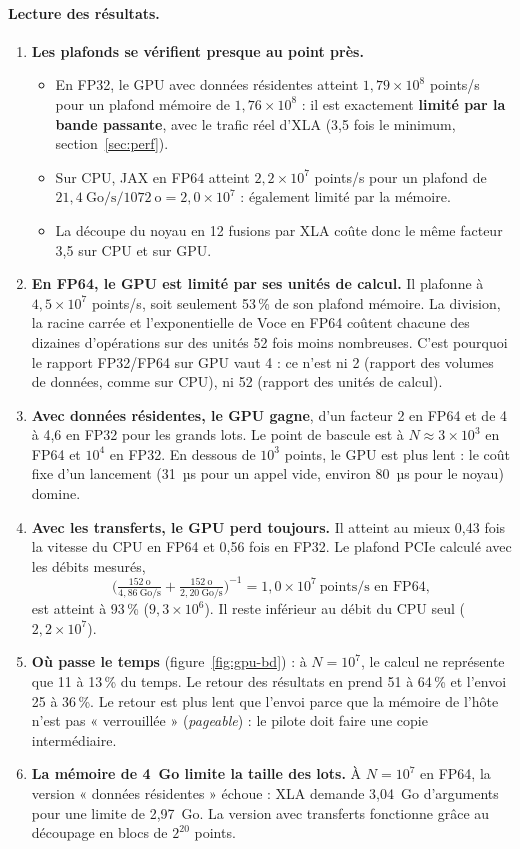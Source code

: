 \paragraph{Lecture des résultats.}
\begin{enumerate}
  \item \textbf{Les plafonds se vérifient presque au point près.}
  \begin{itemize}[nosep]
    \item En FP32, le GPU avec données résidentes atteint $1{,}79\times10^8$ points/s pour un plafond mémoire de $1{,}76\times10^8$ : il est exactement \textbf{limité par la bande passante}, avec le trafic réel d'XLA (3,5 fois le minimum, section~\ref{sec:perf}).
    \item Sur CPU, JAX en FP64 atteint $2{,}2\times10^7$ points/s pour un plafond de $21{,}4\ \text{Go/s} / 1072\ \text{o} = 2{,}0\times10^7$ : également limité par la mémoire.
    \item La découpe du noyau en 12 fusions par XLA coûte donc le même facteur 3,5 sur CPU et sur GPU.
  \end{itemize}
  \item \textbf{En FP64, le GPU est limité par ses unités de calcul.} Il plafonne à $4{,}5\times10^7$ points/s, soit seulement 53\,\% de son plafond mémoire. La division, la racine carrée et l'exponentielle de Voce en FP64 coûtent chacune des dizaines d'opérations sur des unités 52 fois moins nombreuses. C'est pourquoi le rapport FP32/FP64 sur GPU vaut 4 : ce n'est ni 2 (rapport des volumes de données, comme sur CPU), ni 52 (rapport des unités de calcul).
  \item \textbf{Avec données résidentes, le GPU gagne}, d'un facteur 2 en FP64 et de 4 à 4,6 en FP32 pour les grands lots. Le point de bascule est à $N\approx3\times10^3$ en FP64 et $10^4$ en FP32. En dessous de $10^3$ points, le GPU est plus lent : le coût fixe d'un lancement (31~µs pour un appel vide, environ 80~µs pour le noyau) domine.
  \item \textbf{Avec les transferts, le GPU perd toujours.} Il atteint au mieux 0,43 fois la vitesse du CPU en FP64 et 0,56 fois en FP32. Le plafond PCIe calculé avec les débits mesurés,
  \[
  \Big(\tfrac{152\ \text{o}}{4{,}86\ \text{Go/s}}+\tfrac{152\ \text{o}}{2{,}20\ \text{Go/s}}\Big)^{-1} = 1{,}0\times10^7\ \text{points/s en FP64},
  \]
  est atteint à 93\,\% ($9{,}3\times10^6$). Il reste inférieur au débit du CPU seul ($2{,}2\times10^7$).
  \item \textbf{Où passe le temps} (figure~\ref{fig:gpu-bd}) : à $N=10^7$, le calcul ne représente que 11 à 13\,\% du temps. Le retour des résultats en prend 51 à 64\,\% et l'envoi 25 à 36\,\%. Le retour est plus lent que l'envoi parce que la mémoire de l'hôte n'est pas « verrouillée » (\emph{pageable}) : le pilote doit faire une copie intermédiaire.
  \item \textbf{La mémoire de 4~Go limite la taille des lots.} À $N=10^7$ en FP64, la version « données résidentes » échoue : XLA demande 3,04~Go d'arguments pour une limite de 2,97~Go. La version avec transferts fonctionne grâce au découpage en blocs de $2^{20}$ points.
\end{enumerate}

